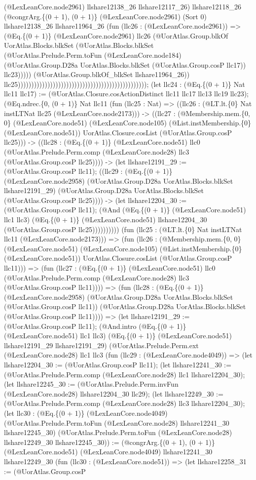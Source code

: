 \documentclass[11pt]{article}
\begin{document}
(@LexLeanCore.node2961) llshare12138\_26 llshare12117\_26) llshare12118\_26 (@congrArg.\{(0 + 1), (0 + 1)\} (@LexLeanCore.node2961) (Sort 0) llshare12138\_26 llshare11964\_26 (fun (llc26 : (@LexLeanCore.node2961)) => (@Eq.\{(0 + 1)\} (@LexLeanCore.node2961) llc26 (@UorAtlas.Group.blkOf UorAtlas.Blocks.blkSet (@UorAtlas.Blocks.blkSet (@UorAtlas.Prelude.Perm.toFun (@LexLeanCore.node184) (@UorAtlas.Group.D28a UorAtlas.Blocks.blkSet (@UorAtlas.Group.cosP llc17)) llc23))))) (@UorAtlas.Group.blkOf\_blkSet llshare11964\_26)) llc25)))))))))))))))))))))))))))))))))))))))))))))))); (let llc24 : (@Eq.\{(0 + 1)\} Nat llc11 llc17) := (@UorAtlas.Closure.cosActionDistinct llc11 llc17 llc13 llc19 llc23); (@Eq.ndrec.\{0, (0 + 1)\} Nat llc11 (fun (llc25 : Nat) => ((llc26 : (@LT.lt.\{0\} Nat instLTNat llc25 (@LexLeanCore.node2173))) -> ((llc27 : (@Membership.mem.\{0, 0\} (@LexLeanCore.node51) (@LexLeanCore.node105) (@List.instMembership.\{0\} (@LexLeanCore.node51)) UorAtlas.Closure.cosList (@UorAtlas.Group.cosP llc25))) -> ((llc28 : (@Eq.\{(0 + 1)\} (@LexLeanCore.node51) llc0 (@UorAtlas.Prelude.Perm.comp (@LexLeanCore.node28) llc3 (@UorAtlas.Group.cosP llc25)))) -> (let llshare12191\_29 := (@UorAtlas.Group.cosP llc11); ((llc29 : (@Eq.\{(0 + 1)\} (@LexLeanCore.node2958) (@UorAtlas.Group.D28a UorAtlas.Blocks.blkSet llshare12191\_29) (@UorAtlas.Group.D28a UorAtlas.Blocks.blkSet (@UorAtlas.Group.cosP llc25)))) -> (let llshare12204\_30 := (@UorAtlas.Group.cosP llc11); (@And (@Eq.\{(0 + 1)\} (@LexLeanCore.node51) llc1 llc3) (@Eq.\{(0 + 1)\} (@LexLeanCore.node51) llshare12204\_30 (@UorAtlas.Group.cosP llc25)))))))))) (fun (llc25 : (@LT.lt.\{0\} Nat instLTNat llc11 (@LexLeanCore.node2173))) => (fun (llc26 : (@Membership.mem.\{0, 0\} (@LexLeanCore.node51) (@LexLeanCore.node105) (@List.instMembership.\{0\} (@LexLeanCore.node51)) UorAtlas.Closure.cosList (@UorAtlas.Group.cosP llc11))) => (fun (llc27 : (@Eq.\{(0 + 1)\} (@LexLeanCore.node51) llc0 (@UorAtlas.Prelude.Perm.comp (@LexLeanCore.node28) llc3 (@UorAtlas.Group.cosP llc11)))) => (fun (llc28 : (@Eq.\{(0 + 1)\} (@LexLeanCore.node2958) (@UorAtlas.Group.D28a UorAtlas.Blocks.blkSet (@UorAtlas.Group.cosP llc11)) (@UorAtlas.Group.D28a UorAtlas.Blocks.blkSet (@UorAtlas.Group.cosP llc11)))) => (let llshare12191\_29 := (@UorAtlas.Group.cosP llc11); (@And.intro (@Eq.\{(0 + 1)\} (@LexLeanCore.node51) llc1 llc3) (@Eq.\{(0 + 1)\} (@LexLeanCore.node51) llshare12191\_29 llshare12191\_29) (@UorAtlas.Prelude.Perm.ext (@LexLeanCore.node28) llc1 llc3 (fun (llc29 : (@LexLeanCore.node4049)) => (let llshare12204\_30 := (@UorAtlas.Group.cosP llc11); (let llshare12241\_30 := (@UorAtlas.Prelude.Perm.comp (@LexLeanCore.node28) llc1 llshare12204\_30); (let llshare12245\_30 := (@UorAtlas.Prelude.Perm.invFun (@LexLeanCore.node28) llshare12204\_30 llc29); (let llshare12249\_30 := (@UorAtlas.Prelude.Perm.comp (@LexLeanCore.node28) llc3 llshare12204\_30); (let llc30 : (@Eq.\{(0 + 1)\} (@LexLeanCore.node4049) (@UorAtlas.Prelude.Perm.toFun (@LexLeanCore.node28) llshare12241\_30 llshare12245\_30) (@UorAtlas.Prelude.Perm.toFun (@LexLeanCore.node28) llshare12249\_30 llshare12245\_30)) := (@congrArg.\{(0 + 1), (0 + 1)\} (@LexLeanCore.node51) (@LexLeanCore.node4049) llshare12241\_30 llshare12249\_30 (fun (llc30 : (@LexLeanCore.node51)) => (let llshare12258\_31 := (@UorAtlas.Group.cosP 
\end{document}
